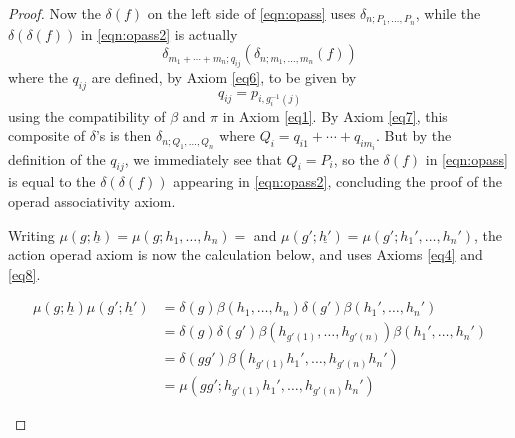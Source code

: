 \begin{proof}
Now the $\delta(f)$ on the left side of \cref{eqn:opass} uses $\delta_{n; P_{1}, \ldots, P_{n}}$, while the $\delta(\delta(f))$ in \cref{eqn:opass2} is actually
  \[
    \delta_{m_1 + \cdots + m_{n}; q_{ij}}(\delta_{n; m_{1}, \ldots, m_{n}} (f))
  \]
where the $q_{ij}$ are defined, by Axiom \eqref{eq6}, to be given by
  \[
    q_{ij} = p_{i,g_{i}^{-1}(j)}
  \]
using the compatibility of $\beta$ and $\pi$ in Axiom \eqref{eq1}. By Axiom \eqref{eq7}, this composite of $\delta$'s  is then $\delta_{n; Q_{1}, \ldots, Q_{n}}$ where $Q_{i} = q_{i1} + \cdots + q_{im_{i}}$. But by the definition of the $q_{ij}$, we immediately see that $Q_{i} = P_{i}$, so the $\delta(f)$ in \cref{eqn:opass} is equal to the $\delta(\delta(f))$ appearing in \cref{eqn:opass2}, concluding the proof of the operad associativity axiom.

Writing $\mu(g;\underline{h}) = \mu\left(g; h_{1}, \ldots, h_{n}\right)= $ and $\mu(g';\underline{h'}) = \mu\left(g'; h_{1}', \ldots, h_{n}'\right)$, the action operad axiom is now the calculation below, and uses Axioms \eqref{eq4} and \eqref{eq8}.
\begin{small}
  \begin{align*}
    \mu(g;\underline{h})\mu(g';\underline{h'}) &= \delta\left(g\right) \beta\left(h_{1}, \ldots, h_{n}\right) \delta\left(g'\right) \beta\left(h_{1}', \ldots, h_{n}'\right) \\
    &= \delta\left(g\right) \delta\left(g'\right) \beta\left(h_{g'(1)}, \ldots, h_{g'(n)}\right)  \beta\left(h_{1}', \ldots, h_{n}'\right) \\
    &= \delta\left(gg'\right) \beta\left(h_{g'(1)}h_{1}', \ldots, h_{g'(n)}h_{n}'\right) \\
    &= \mu\left(gg'; h_{g'(1)}h_{1}', \ldots, h_{g'(n)}h_{n}'\right)
  \end{align*}
\end{small}
\end{proof}

